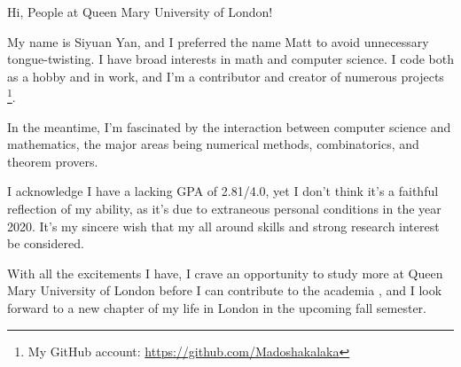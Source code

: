 \documentclass[11pt]{article}
\begin{document}
    Hi, People at Queen Mary University of London!

    My name is Siyuan Yan,
    and I preferred the name Matt to avoid unnecessary tongue-twisting.
    I have broad interests in math and computer science.
    I code both as a hobby and in work, and I'm a contributor and creator of numerous projects
    \footnote{My GitHub account: \url{https://github.com/Madoshakalaka}}.

    In the meantime, I'm fascinated by the interaction between computer science and mathematics,
    the major areas being numerical methods, combinatorics, and theorem provers.

    I acknowledge I have a lacking GPA of 2.81/4.0, yet I don't think it's a faithful reflection of my ability,
    as it's due to extraneous personal conditions in the year 2020.
    It's my sincere wish that my all around skills and strong research interest be considered.


    

    

    

    With all the excitements I have,
    I crave an opportunity to study more at Queen Mary University of London before I can contribute to the academia
    , and I look forward to a new chapter of my life in London in the upcoming fall semester.
\end{document}
